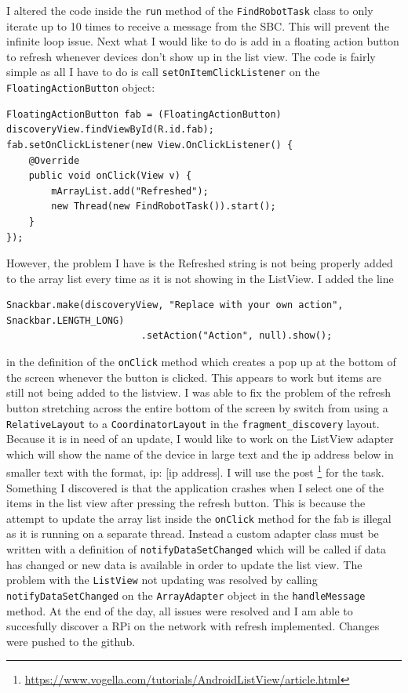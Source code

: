 \documentclass[fontsize=11pt, %
                             paper=a4, %
                             twoside, %
                             captions=tableheading,
                             index=totoc,
                             hyperref]{labbook}
\begin{document}
\begin{addmargin}[0cm]{0cm}
I altered the code inside the \texttt{run} method of the \texttt{FindRobotTask} class to only iterate up to 10 times to receive a message from the SBC. This will prevent the infinite loop issue. Next what I would like to do is add in a floating action button to refresh whenever devices don't show up in the list view. The code is fairly simple as all I have to do is call \texttt{setOnItemClickListener} on the \texttt{FloatingActionButton} object:
\begin{Verbatim}
FloatingActionButton fab = (FloatingActionButton) discoveryView.findViewById(R.id.fab);
fab.setOnClickListener(new View.OnClickListener() {
	@Override
	public void onClick(View v) {
		mArrayList.add("Refreshed");
		new Thread(new FindRobotTask()).start();
	}
});
\end{Verbatim}
However, the problem I have is the Refreshed string is not being properly added to the array list every time as it is not showing in the ListView. I added the line
\begin{Verbatim}
Snackbar.make(discoveryView, "Replace with your own action", Snackbar.LENGTH_LONG)
                        .setAction("Action", null).show();
\end{Verbatim}
in the definition of the \texttt{onClick} method which creates a pop up at the bottom of the screen whenever the button is clicked. This appears to work but items are still not being added to the listview. I was able to fix the problem of the refresh button stretching across the entire bottom of the screen by switch from using a \texttt{RelativeLayout} to a \texttt{CoordinatorLayout} in the \texttt{fragment\_discovery} layout. Because it is in need of an update, I would like to work on the ListView adapter which will show the name of the device in large text and the ip address below in smaller text with the format, ip: [ip address]. I will use the post \footnote{\url{https://www.vogella.com/tutorials/AndroidListView/article.html}} for the task.
\medbreak\noindent
Something I discovered is that the application crashes when I select one of the items in the list view after pressing the refresh button. This is because the attempt to update the array list inside the \texttt{onClick} method for the fab is illegal as it is running on a separate thread. Instead a custom adapter class must be written with a definition of \texttt{notifyDataSetChanged} which will be called if data has changed or new data is available in order to update the list view.
\medbreak\noindent
The problem with the \texttt{ListView} not updating was resolved by calling \texttt{notifyDataSetChanged} on the \texttt{ArrayAdapter} object in the \texttt{handleMessage} method. 
\medbreak\noindent
At the end of the day, all issues were resolved and I am able to succesfully discover a RPi on the network with refresh implemented. Changes were pushed to the github.


\end{addmargin}
\end{document}
